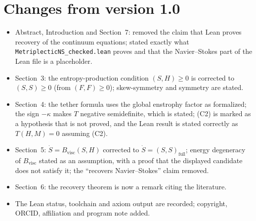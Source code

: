\documentclass[11pt,a4paper]{article}
\begin{document}
\section*{Changes from version 1.0}
\begin{itemize}
\item Abstract, Introduction and Section~7: removed the claim that Lean proves recovery of the continuum equations; stated exactly what \texttt{MetriplecticNS\_checked.lean} proves and that the Navier--Stokes part of the Lean file is a placeholder.
\item Section~3: the entropy-production condition \((S,H)\ge0\) is corrected to \((S,S)\ge0\) (from \((F,F)\ge0\)); skew-symmetry and symmetry are stated.
\item Section~4: the tether formula uses the global enstrophy factor as formalized; the sign \(-\kappa\) makes \(T\) negative semidefinite, which is stated; (C2) is marked as a hypothesis that is not proved, and the Lean result is stated correctly as \(T(H,M)=0\) assuming (C2).
\item Section~5: \(\dot S=B_{\mathrm{visc}}(S,H)\) corrected to \(\dot S=(S,S)_{\mathrm{full}}\); energy degeneracy of \(B_{\mathrm{visc}}\) stated as an assumption, with a proof that the displayed candidate does not satisfy it; the ``recovers Navier--Stokes'' claim removed.
\item Section~6: the recovery theorem is now a remark citing the literature.
\item The Lean status, toolchain and axiom output are recorded; copyright, ORCID, affiliation and program note added.
\end{itemize}
\end{document}

